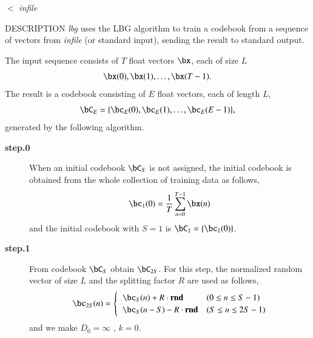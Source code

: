 \begin{synopsis}
\item [lbg] [ --l $L$ ] [ --n $N$ ] [ --s $S$ ] [ --e $E$ ]
        [ --F $F$ ] [ --i $I$ ] [ --m $M$ ] [ --S $s$ ] 
\item [\ ~~~~~] [ --c $C$ ] [ --d $D$ ] [ --r $R$ ] [ {\em indexfile} ] $<$ {\em infile}
\end{synopsis}

\begin{qsection}{DESCRIPTION}
{\em lbg} uses the LBG algorithm to train a codebook 
from a sequence of vectors from {\em infile} (or standard input), 
sending the result to standard output.

The input sequence consists of $T$ float vectors $\bx$, 
each of size $L$
\begin{displaymath} 
\bx(0), \bx(1), \dots, \bx(T-1). 
\end{displaymath}
The result is a codebook consisting of $E$ float vectors, 
each of length $L$,
\begin{displaymath}
\bC_E =\{ \bc_E(0), \bc_E(1), \dots, \bc_E(E-1) \}, 
\end{displaymath}
generated by the following algorithm.

\begin{description}
\item[\bf step.0~~~]
When an initial codebook $\bC_S$ is not assigned,
the initial codebook is obtained from the whole collection of
training data as follows,
\begin{displaymath}
\bc_1(0) = \frac{1}{T} \sum_{n=0}^{T-1} \bx(n)
\end{displaymath}
and the initial codebook with $S = 1$ is $\bC_1 = \{ \bc_1(0) \}$.

\item[\bf step.1~~~]
From codebook $\bC_{S}$ obtain $\bC_{2S}$.
For this step, the normalized random vector of size $L$ and the splitting factor
$R$ are used as follows,
\begin{displaymath}
\bc_{2S}(n)= \begin{cases}
\;\;\bc_S(n) + R \cdot \bm{\mathrm{rnd}} & ( 0 \le n \le S-1 ) \\
\;\;\bc_S(n-S) - R \cdot \bm{\mathrm{rnd}} & ( S \le n \le 2S-1 )
\end{cases}
\end{displaymath}
and we make $D_0 = \infty$ , $k = 0$.


\end{description}
\end{qsection}
